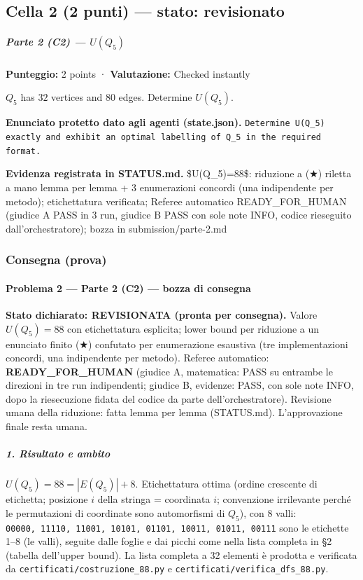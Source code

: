 \documentclass[11pt,a4paper]{article}
\begin{document}
\subsection{Cella 2 (2 punti) — stato: revisionato}
\subparagraph{\texorpdfstring{Parte 2 (C2) ---
\(U(Q_5)\)}{Parte 2 (C2) --- U(Q\_5)}}\label{parte-2-c2-uq_5}

\textbf{Punteggio:} 2 points · \textbf{Valutazione:} Checked instantly

\(Q_5\) has \(32\) vertices and \(80\) edges. Determine \(U(Q_5)\).

\textbf{Enunciato protetto dato agli agenti (state.json).} \texttt{Determine U(Q\_5) exactly and exhibit an optimal labelling of Q\_5 in the required format.}

\textbf{Evidenza registrata in STATUS.md.} \$U(Q\_5)=88\$: riduzione a (★) riletta a mano lemma per lemma + 3 enumerazioni concordi (una indipendente per metodo); etichettatura verificata; Referee automatico READY\_FOR\_HUMAN (giudice A PASS in 3 run, giudice B PASS con sole note INFO, codice rieseguito dall'orchestratore); bozza in submission/parte-2.md

\subsubsection{Consegna (prova)}
\paragraph{Problema 2 --- Parte 2 (C2) --- bozza di
consegna}\label{problema-2-parte-2-c2-bozza-di-consegna}

\textbf{Stato dichiarato: REVISIONATA (pronta per consegna).} Valore
\(U(Q_5)=88\) con etichettatura esplicita; lower bound per riduzione a
un enunciato finito (★) confutato per enumerazione esaustiva (tre
implementazioni concordi, una indipendente per metodo). Referee
automatico: \textbf{READY\_FOR\_HUMAN} (giudice A, matematica: PASS su
entrambe le direzioni in tre run indipendenti; giudice B, evidenze:
PASS, con sole note INFO, dopo la riesecuzione fidata del codice da
parte dell'orchestratore). Revisione umana della riduzione: fatta lemma
per lemma (STATUS.md). L'approvazione finale resta umana.

\subparagraph{1. Risultato e ambito}\label{risultato-e-ambito}

\(U(Q_5) = 88 = |E(Q_5)| + 8\). Etichettatura ottima (ordine crescente
di etichetta; posizione \(i\) della stringa = coordinata \(i\);
convenzione irrilevante perché le permutazioni di coordinate sono
automorfismi di \(Q_5\)), con 8 valli:
\texttt{00000,\ 11110,\ 11001,\ 10101,\ 01101,\ 10011,\ 01011,\ 00111}
sono le etichette 1--8 (le valli), seguite dalle foglie e dai picchi
come nella lista completa in §2 (tabella dell'upper bound). La lista
completa a 32 elementi è prodotta e verificata da
\texttt{certificati/costruzione\_88.py} e
\texttt{certificati/verifica\_dfs\_88.py}.
\end{document}
